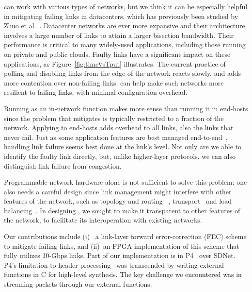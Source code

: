 \OurSys can work with various types of networks, but we think it can be
especially helpful in mitigating failing links in datacenters, which has
previously been studied by Zhuo et al.~\cite{Zhuo:2017:UMP:3098822.3098849}.
Datacenter networks are ever more expansive and their architecture involves a
large number of links to attain a larger bisection bandwidth. Their
performance is critical to many widely-used applications, including those
running on private and public clouds. Faulty  links have a significant impact
on these applications, as Figure~\ref{fig:timeVsTput}  illustrates. The
current practice of polling and disabling links from the edge of the network
reacts slowly, and adds more contention over non-failing links. \OurSys can help
make such networks more resilient to failing links, with minimal configuration
overhead.

Running \OurSys as an in-network function makes more sense than
running it in end-hosts since the problem that \OurSys mitigates is
typically restricted to a fraction of the network.  Applying \OurSys to
end-hosts adds overhead to all links, also the links that never fail.
Just as some application features are
best managed end-to-end~\cite{Saltzer84end-to-endarguments}, handling
link failure seems best done at the link's level. Not only are we able to
identify the faulty link directly, but, unlike higher-layer protocols,
we can also distinguish link failure from congestion.

Programmable network hardware alone is not sufficient to solve this problem: one
also needs a careful design since link management might interfere with
other features of the network, such as topology and routing~
\cite{Greenberg:2011:VSF:1897852.1897877,
NiranjanMysore:2009:PSF:1594977.1592575,
Agarwal:2014:SMS:2620728.2620758},
transport~\cite{Raiciu:2011:IDP:2043164.2018467,Alizadeh:2010:DCT:1851275.1851192}
and load balancing~\cite{Alizadeh:2014:CDC:2740070.2626316}.
In designing \OurSys, we sought to make it transparent to other
features of the network, to facilitate its interoperation with
existing networks.

Our contributions include (i)~
a link-layer forward error-correction (FEC) scheme to mitigate failing
links, and (ii)~an FPGA implementation of this scheme that fully utilizes 10-Gbps
links. Part of our implementation is in
P4~\cite{Bosshart:2014:PPP:2656877.2656890} over SDNet.
P4's limitation to header processing~\cite{Dang:2017:WPL:3050220.3050231}
was transcended by writing external functions in C for high-level synthesis.
The key challenge we encountered was in streaming packets through our
external functions.%

